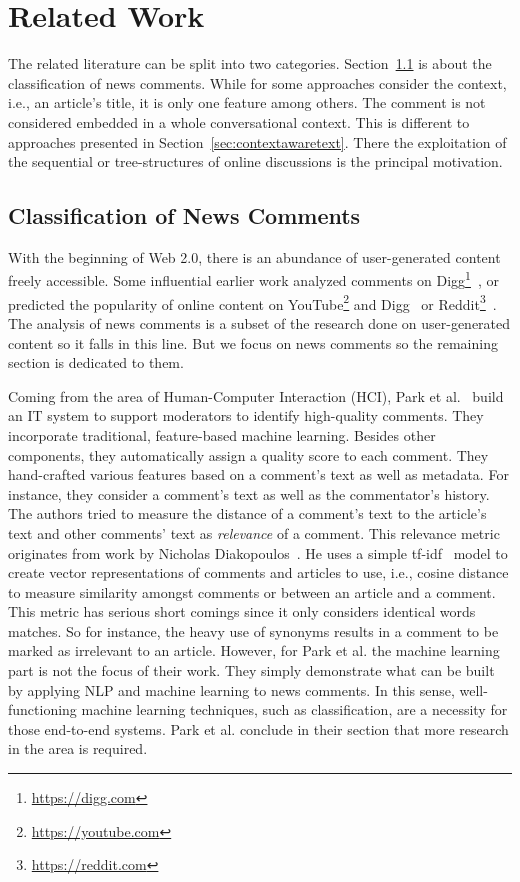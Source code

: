 \chapter{Related Work}
\label{ch:related_work}

The related literature can be split into two categories. Section~\ref{sec:classnews} is about the classification of news comments. While for some approaches consider the context, i.e., an article's title, it is only one feature among others. The comment is not considered embedded in a whole conversational context. This is different to approaches presented in Section~\ref{sec:contextawaretext}. There the exploitation of the sequential or tree-structures of online discussions is the principal motivation.

\section{Classification of News Comments}
\label{sec:classnews}

With the beginning of Web 2.0, there is an abundance of user-generated content freely accessible. Some influential earlier work analyzed comments on Digg\footnote{\url{https://digg.com}}~\cite{Gomez:2008:SAS:1367497.1367585, Lampe:2004:SBD:985692.985761}, or predicted the popularity of online content on YouTube\footnote{\url{https://youtube.com}} and Digg~\cite{Szabo:2010:PPO:1787234.1787254} or Reddit\footnote{\url{https://reddit.com}}~\cite{Rizos:2016:PNP:2872518.2890096}. The analysis of news comments is a subset of the research done on user-generated content so it falls in this line. But we focus on news comments so the remaining section is dedicated to them.

Coming from the area of Human-Computer Interaction (HCI), Park et al.~\cite{Park:2016:SCM:2858036.2858389} build an IT system to support moderators to identify high-quality comments. They incorporate traditional, feature-based machine learning. Besides other components, they automatically assign a quality score to each comment. They hand-crafted various features based on a comment's text as well as metadata. For instance, they consider a comment's text as well as the commentator's history. The authors tried to measure the distance of a comment's text to the article's text and other comments' text as \textit{relevance} of a comment. This relevance metric originates from work by Nicholas Diakopoulos~\cite{Diakopoulos:2015:EEC:2675133.2675160}. He uses a simple tf-idf~\cite{salton1986introduction} model to create vector representations of comments and articles to use, i.e., cosine distance to measure similarity amongst comments or between an article and a comment. This metric has serious short comings since it only considers identical words matches. So for instance, the heavy use of synonyms results in a comment to be marked as irrelevant to an article. However, for Park et al. the machine learning part is not the focus of their work. They simply demonstrate what can be built by applying NLP and machine learning to news comments. In this sense, well-functioning machine learning techniques, such as classification, are a necessity for those end-to-end systems. Park et al. conclude in their section that more research in the area is required.

